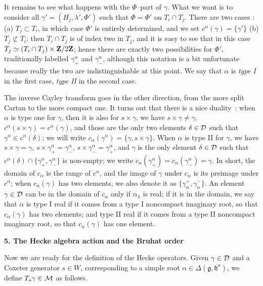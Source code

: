 \documentclass[11 pt]{article}
\def\a{\alpha}
\def\D{{\cal D}}
\def\d{\delta}
\def\F{\Phi}
\def\g{\gamma}
\def\gf{{\mathfrak g}}
\def\hf{{\mathfrak h}}
\def\l{\lambda}
\def\M{{\cal M}}
\def\Z{{\bf Z}}
\begin{document}
It remains to see what happens with the $\F$--part of $\g$. What we want is
to consider all $\g'=(H_j,\l',\F')$ such that $\F=\F'$ on $T_i\cap T_j$. There
are
two cases : (a) $T_j\subset T_i$, in which case $\F'$ is entirely determined,
and we set $c^\a(\g)=\{\g'\}$ (b) $T_j\not\subset T_i$; then $T_i\cap T_j$ is
of index two in $T_j$, and it is easy to see that in this case 
$T_j\simeq(T_i\cap T_j)\times\Z/2\Z$; hence there are exactly two possibilities
for $\F'$, traditionally labelled $\g^\a_+$ and $\g^\a_-$, although this
notation is a bit unfortunate because really the two are indistinguishable
at this point. We say that $\a$ is {\em type I} in the first case, {\em type 
II} in the second case.

The inverse Cayley transform goes in the other direction, from the more
split Cartan to the more compact one. It turns out that there is a nice
duality~: when $\a$ is type one for $\g$, then it is also for $s\times\g$,
we have $s\times\g\neq\g$,
$c^\a(s\times\g)=c^\a(\g)$, and those are the only two elements $\d\in\D$
such that $\g^\a\in c^\a(\d)$; we will write $c_\a(\g^\a)=\{\g,s\times\g\}$.
When $\a$ is type II for $\g$, we have $s\times\g=\g$, 
$s\times\g^\a_+=\g^\a_-$, $s\times\g^\a_-=\g^\a_+$, and $\g$ is the only
element $\d\in\D$ such that $c^\a(\d)\cap\{\g^\a_+,\g^\a_-\}$ is non-empty;
we write $c_\a(\g^\a_+)=c_\a(\g^\a_-)=\g$. In short, the domain of $c_\a$ is
the range of $c^\a$, and the image of $\g$ under $c_\a$ is its preimage
under $c^\a$; when $c_\a(\g)$ has two elements, we also denote it as
$\{\g^+_\a,\g^-_\a\}$. An element $\g\in\D$ can be in the domain of $c_\a$
only if $\a_\l$ is real; if it is in the domain, we say that $\a$ is type I
real if it comes from a type I noncompact imaginary root, so that
$c_\a(\g)$ has two elements; and type II real if it comes from a type II
noncompact imaginary root, so that $c_\a(\g)$ has one element.

\bigskip

\noindent\textbf{5. The Hecke algebra action and the Bruhat order}

\medskip

Now we are ready for the definition of the Hecke operators. Given $\g\in\D$ 
and a Coxeter generator $s\in W$, corresponding to a simple root 
$\a\in\Delta(\gf,\hf^a)$, we define $T_s\g\in \M$ as follows.
\end{document}
